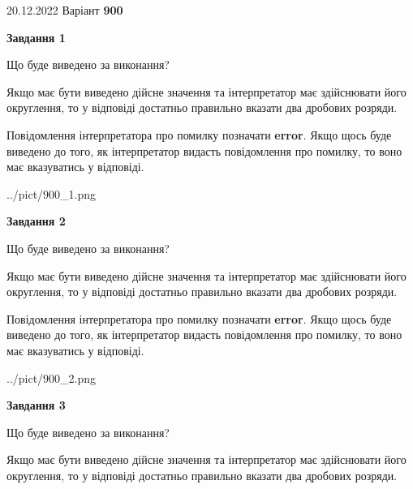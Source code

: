\documentclass[12pt, ukrainian]{article}
\begin{document}
{20.12.2022 Варіант \No \textbf { 900 }\par}
{
\begin {Large}

{\begin {center}\textbf{Завдання 1}\end {center}}\par
Що буде виведено за виконання? \par

Якщо має бути виведено дійсне значення та інтерпретатор має здійснювати його округлення, 
то у відповіді достатньо правильно вказати два дробових розряди.

Повідомлення інтерпретатора про помилку позначати \textbf{error}.
Якщо щось буде виведено до того, як інтерпретатор видасть повідомлення про помилку, 
то воно має вказуватись у відповіді. \par

\begin{center}
	{../pict/900_1.png}
\end{center}
\newpage

{\begin {center}\textbf{Завдання 2}\end {center}}\par
Що буде виведено за виконання? \par

Якщо має бути виведено дійсне значення та інтерпретатор має здійснювати його округлення, 
то у відповіді достатньо правильно вказати два дробових розряди.

Повідомлення інтерпретатора про помилку позначати \textbf{error}.
Якщо щось буде виведено до того, як інтерпретатор видасть повідомлення про помилку, 
то воно має вказуватись у відповіді. \par

\begin{center}
	{../pict/900_2.png}
\end{center}
\newpage

{\begin {center}\textbf{Завдання 3}\end {center}}\par
Що буде виведено за виконання? \par

Якщо має бути виведено дійсне значення та інтерпретатор має здійснювати його округлення, 
то у відповіді достатньо правильно вказати два дробових розряди.


\end{Large}}
\end{document}
